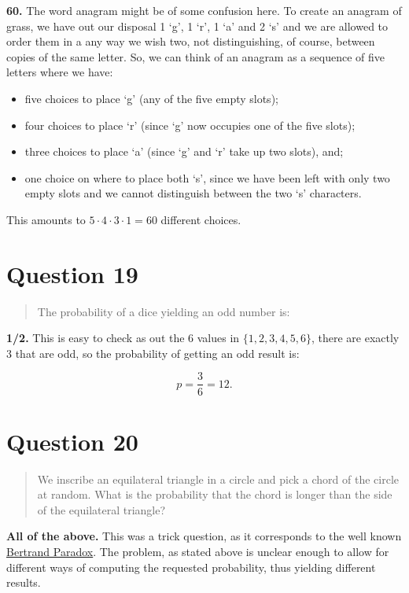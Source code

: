 \documentclass[
]{article}
\providecommand{\tightlist}{%
  \setlength{\itemsep}{0pt}\setlength{\parskip}{0pt}}
\begin{document}
\textbf{60.} The word anagram might be of some confusion here. To create
an anagram of grass, we have out our disposal 1 `g', 1 `r', 1 `a' and 2
`s' and we are allowed to order them in a any way we wish two, not
distinguishing, of course, between copies of the same letter. So, we can
think of an anagram as a sequence of five letters where we have:

\begin{itemize}
\tightlist
\item
  five choices to place `g' (any of the five empty slots);
\item
  four choices to place `r' (since `g' now occupies one of the five
  slots);
\item
  three choices to place `a' (since `g' and `r' take up two slots), and;
\item
  one choice on where to place both `s', since we have been left with
  only two empty slots and we cannot distinguish between the two `s'
  characters.
\end{itemize}

This amounts to \(5\cdot4\cdot3\cdot1=60\) different choices.

\section{Question 19}\label{question-19}

\begin{quote}
The probability of a dice yielding an odd number is:
\end{quote}

\textbf{1/2.} This is easy to check as out the 6 values in
\(\{1,2,3,4,5,6\}\), there are exactly 3 that are odd, so the
probability of getting an odd result is:

\[p=\frac{3}{6}={1}{2}.\]

\section{Question 20}\label{question-20}

\begin{quote}
We inscribe an equilateral triangle in a circle and pick a chord of the
circle at random. What is the probability that the chord is longer than
the side of the equilateral triangle?
\end{quote}

\textbf{All of the above.} This was a trick question, as it corresponds
to the well known
\href{https://en.wikipedia.org/wiki/Bertrand_paradox_(probability)}{Bertrand
Paradox}. The problem, as stated above is unclear enough to allow for
different ways of computing the requested probability, thus yielding
different results.
\end{document}
